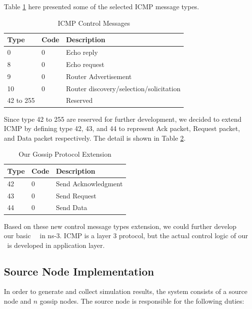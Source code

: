 Table \ref{table:2} here presented some of the selected ICMP message types. 

\begin{table}[h]
	\centering
	\caption{ICMP Control Messages}
	\label{table:2}
	\begin{tabular}{|p{1.5cm}|p{0.8 cm}|p{6.5 cm}|}
		\hline
		Type & Code & Description \\                                                           
		\hline
		0  & 0   & Echo reply   \\ \hline
		8  &  0 & Echo request \\ 
		\hline
		9 & 0 & Router Advertisement \\
		\hline
		10	& 0	&	Router discovery/selection/solicitation \\
		\hline
		42 to 255    &   & Reserved    \\ 
		\hline
	\end{tabular}
\end{table}

Since type 42 to 255 are reserved for further development, we decided to extend ICMP by defining type 42, 43, and 44 to represent Ack packet, Request packet, and Data packet respectively. The detail is shown in Table \ref{table:3}.

\begin{table}[h]
	\centering
	\caption{Our Gossip Protocol Extension}
	\label{table:3}
	\begin{tabular}{|p{0.8cm}|p{0.8 cm}|p{4.0 cm}|}
		\hline
		Type & Code & Description \\                                                           
		\hline
		42  & 0   & Send Acknowledgment   \\ \hline
		43  &  0 & Send Request \\ 
		\hline
		44 & 0 & Send Data \\
		\hline
	\end{tabular}
\end{table}

Based on these new control message types extension, we could further develop our basic \pp  ~\gp ~in ns-3. ICMP is a layer 3 protocol, but the actual control logic of our \gp ~is developed in application layer. 

\subsection{Source Node Implementation}
In order to generate and collect simulation results, the system consists of a source node and $n$ gossip nodes. The source node is responsible for the following duties:

